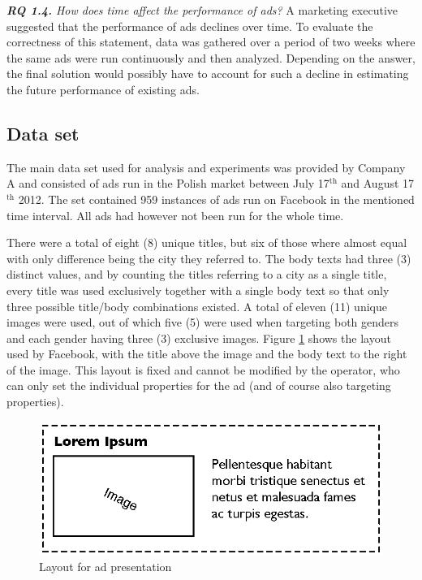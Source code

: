\documentclass{sig-alternate}
\newcommand{\superscript}[1]{\ensuremath{^{\textrm{#1}}}}
\begin{document}
\textit{\textbf{RQ 1.4.} How does time affect the performance of ads?}
A marketing executive suggested that the performance of ads declines over time. To evaluate the correctness of this statement, data was gathered over a period of two weeks where the same ads were run continuously and then analyzed. Depending on the answer, the final solution would possibly have to account for such a decline in estimating the future performance of existing ads.

\subsection{Data set}
The main data set used for analysis and experiments was provided by Company A and consisted of ads run in the Polish market between July 17\superscript{th} and August 17\superscript{th} 2012. The set contained 959 instances of ads run on Facebook in the mentioned time interval. All ads had however not been run for the whole time.

There were a total of eight (8) unique titles, but six of those where almost equal with only difference being the city they referred to. The body texts had three (3) distinct values, and by counting the titles referring to a city as a single title, every title was used exclusively together with a single body text so that only three possible title/body combinations existed. A total of eleven (11) unique images were used, out of which five (5) were used when targeting both genders and each gender having three (3) exclusive images. Figure \ref{fig:AdLayout} shows the layout used by Facebook, with the title above the image and the body text to the right of the image. This layout is fixed and cannot be modified by the operator, who can only set the individual properties for the ad (and of course also targeting properties).

\begin{figure}[htpb]
	\centering
	\includegraphics[width=\columnwidth]{ad-layout.eps}
	\caption{Layout for ad presentation}
	\label{fig:AdLayout}
\end{figure}
\end{document}
